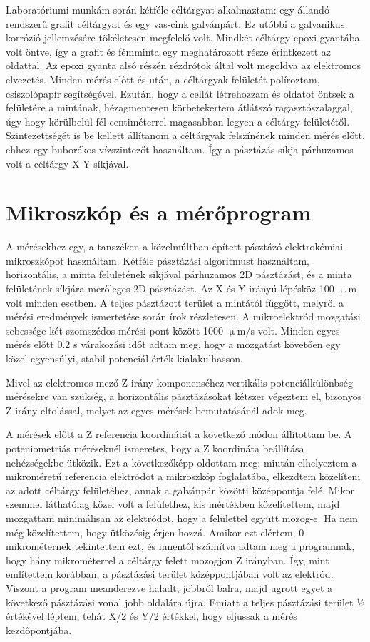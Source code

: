 Laboratóriumi munkám során kétféle céltárgyat alkalmaztam: egy állandó rendszerű grafit céltárgyat és egy vas-cink galvánpárt. Ez utóbbi a galvanikus korrózió jellemzésére tökéletesen megfelelő volt. Mindkét céltárgy epoxi gyantába volt öntve, így a grafit és fémminta egy meghatározott része érintkezett az oldattal. Az epoxi gyanta alsó részén rézdrótok által volt megoldva az elektromos elvezetés. Minden mérés előtt és után, a céltárgyak felületét políroztam, csiszolópapír segítségével. Ezután, hogy a cellát létrehozzam és oldatot öntsek a felületére a mintának, hézagmentesen körbetekertem átlátszó ragasztószalaggal, úgy hogy körülbelül fél centiméterrel magasabban legyen a céltárgy felületétől. Szintezettségét is be kellett állítanom a céltárgyak felszínének minden mérés előtt, ehhez egy buborékos vízszintezőt használtam. Így a pásztázás síkja párhuzamos volt a céltárgy X-Y síkjával.

\section{Mikroszkóp és a mérőprogram}

A mérésekhez egy, a tanszéken a közelmúltban épített pásztázó elektrokémiai mikroszkópot használtam. Kétféle pásztázási algoritmust használtam, horizontális, a minta felületének síkjával párhuzamos 2D pásztázást, és a minta felületének síkjára merőleges 2D pásztázást. Az X és Y irányú lépésköz 100 $\upmu$m volt minden esetben. A teljes pásztázott terület a mintától függött, melyről a mérési eredmények ismertetése során írok részletesen.  A mikroelektród mozgatási sebessége két szomszédos mérési pont között 1000 $\upmu$m/s volt. Minden egyes mérés előtt 0.2 s várakozási időt adtam meg, hogy a mozgatást követően egy közel egyensúlyi, stabil potenciál érték kialakulhasson.  

Mivel az elektromos mező Z irány komponenséhez vertikális potenciálkülönbség mérésekre van szükség, a horizontális pásztázásokat kétszer végeztem el, bizonyos Z irány eltolással, melyet az egyes mérések bemutatásánál adok meg.

A mérések előtt a Z referencia koordinátát a következő módon állítottam be. A poteniometriás méréseknél ismeretes, hogy a Z koordináta beállítása nehézségekbe ütközik. Ezt a következőképp oldottam meg: miután elhelyeztem a mikroméretű referencia elektródot a mikroszkóp foglalatába, elkezdtem közelíteni az adott céltárgy felületéhez, annak a galvánpár közötti középpontja felé. Mikor szemmel láthatólag közel volt a felülethez, kis mértékben közelítettem, majd mozgattam minimálisan az elektródot, hogy a felülettel együtt mozog-e. Ha nem még közelítettem, hogy ütközésig érjen hozzá. Amikor ezt elértem, 0 mikrométernek tekintettem ezt, és innentől számítva adtam meg a programnak, hogy hány mikrométerrel a céltárgy felett mozogjon Z irányban. Így, mint említettem korábban, a pásztázási terület középpontjában volt az elektród. Viszont a program meanderezve haladt, jobbról balra, majd ugrott egyet a következő pásztázási vonal jobb oldalára újra.  Emiatt a teljes pásztázási terület ½ értékével léptem, tehát X/2 és Y/2 értékkel, hogy eljussak a mérés kezdőpontjába. 

